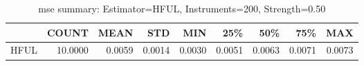 \begin{table}[ht]
\centering
\caption{mse summary: Estimator=HFUL, Instruments=200, Strength=0.50}
\begin{tabular}{lrrrrrrrr}
\toprule
 & COUNT & MEAN & STD & MIN & 25\% & 50\% & 75\% & MAX \\
\midrule
HFUL & 10.0000 & 0.0059 & 0.0014 & 0.0030 & 0.0051 & 0.0063 & 0.0071 & 0.0073 \\
\bottomrule
\end{tabular}
\end{table}
